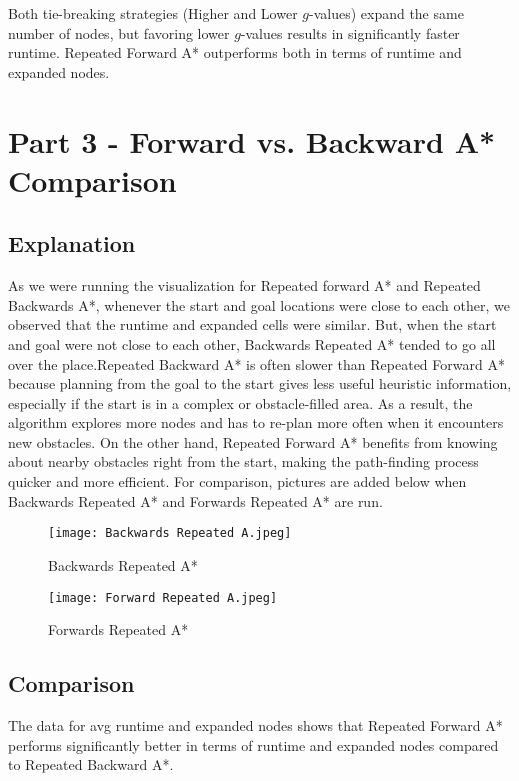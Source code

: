 \documentclass[12pt]{article}
\begin{document}
Both tie-breaking strategies (Higher and Lower $g$-values) expand the same number of nodes, but favoring lower $g$-values results in significantly faster runtime. Repeated Forward A* outperforms both in terms of runtime and expanded nodes.

\section*{Part 3 - Forward vs. Backward A* Comparison}

\subsection*{Explanation}
As we were running the visualization for Repeated forward A* and Repeated Backwards A*, whenever the start and goal locations were close to each other, we observed that the runtime and expanded cells were similar. But, when the start and goal were not close to each other, Backwards Repeated A* tended to go all over the place.Repeated Backward A* is often slower than Repeated Forward A* because planning from the goal to the start gives less useful heuristic information, especially if the start is in a complex or obstacle-filled area. As a result, the algorithm explores more nodes and has to re-plan more often when it encounters new obstacles. On the other hand, Repeated Forward A* benefits from knowing about nearby obstacles right from the start, making the path-finding process quicker and more efficient. For comparison, pictures are added below when Backwards Repeated A* and Forwards Repeated A* are run. 

\begin{figure}
    \centering
    \texttt{[image: Backwards Repeated A.jpeg]}
    \caption{Backwards Repeated A*}
    \label{fig:enter-label}
\end{figure}

\begin{figure}
    \centering
    \texttt{[image: Forward Repeated A.jpeg]}
    \caption{Forwards Repeated A*}
    \label{fig:enter-label}
\end{figure}

\subsection*{Comparison}
The data for avg runtime and expanded nodes shows that Repeated Forward A* performs significantly better in terms of runtime and expanded nodes compared to Repeated Backward A*.
\end{document}
